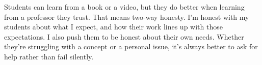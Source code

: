 \documentclass[12pt,letterpaper]{article}
\begin{document}
Students can learn from a book or a video, but they do better when learning from a professor they trust. That means two-way honesty. I'm honest with my students about what I expect, and how their work lines up with those expectations. I also push them to be honest about their own needs. Whether they're struggling with a concept or a personal issue, it's always better to ask for help rather than fail silently.

\end{document}

